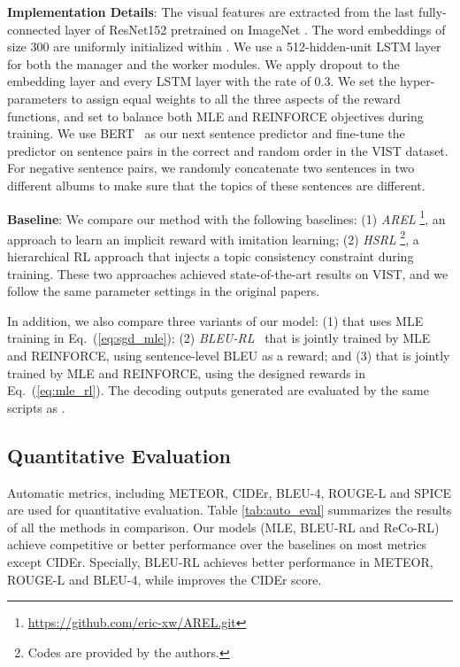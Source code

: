 \documentclass[letterpaper]{article} \usepackage{aaai20}  \usepackage{times}  \usepackage{helvet} \usepackage{courier}  \usepackage[hyphens]{url}  \usepackage{graphicx} \urlstyle{rm} \def\UrlFont{\rm}  \usepackage{graphicx}  \frenchspacing  \setlength{\pdfpagewidth}{8.5in}  \setlength{\pdfpageheight}{11in}  \usepackage{times}
\newcommand{\bleu}{BLEU-RL }
\newcommand{\citet}[1]{\citeauthor{#1} \shortcite{#1}}
\begin{document}
\noindent \textbf{Implementation Details}: The visual features are extracted from the last fully-connected layer of ResNet152 pretrained on ImageNet \cite{he2016deep}. The word embeddings of size 300 are uniformly initialized within . We use a 512-hidden-unit LSTM layer for both the manager and the worker modules. We apply dropout to the embedding layer and every LSTM layer with the rate of 0.3.  We set the hyper-parameters  to assign equal weights to all the three aspects of the reward functions, and set  to balance both MLE and REINFORCE objectives during training. We use BERT~\cite{devlin2018bert} as our next sentence predictor and fine-tune the predictor on sentence pairs in the correct and random order in the VIST dataset. For negative sentence pairs, we randomly concatenate two sentences in two different albums to make sure that the topics of these sentences are different. 

\noindent \textbf{Baseline}: We compare our method with the following baselines:
(1) \textit{AREL} \cite{xinwang-wenhuchen-ACL-2018}\footnote{\url{https://github.com/eric-xw/AREL.git}}, an approach to learn an implicit reward with imitation learning;
(2) \textit{HSRL} \cite{huang2018hierarchically}\footnote{Codes are provided by the authors.}, a hierarchical RL approach that injects a topic consistency constraint during training. 
These two approaches achieved state-of-the-art results on VIST, and we follow the same parameter settings in the original papers. 

In addition, we also compare three variants of our model: (1) \textit{\mle} that uses MLE training in Eq.~(\ref{eq:sgd_mle}); (2) \textit{\bleu}~that is jointly trained by MLE and REINFORCE, using sentence-level BLEU as a reward; and (3) \textit{\model} that is jointly trained by MLE and REINFORCE, using the designed rewards in Eq.~(\ref{eq:mle_rl}). The decoding outputs generated are evaluated by the same scripts as \citet{xinwang-wenhuchen-ACL-2018}. 

\subsection{Quantitative Evaluation} 
Automatic metrics, including METEOR, CIDEr, BLEU-4, ROUGE-L and SPICE are used for quantitative evaluation. Table \ref{tab:auto_eval} summarizes the results of all the methods in comparison. Our models (MLE, \bleu and ReCo-RL) achieve competitive or better performance over the baselines on most metrics except CIDEr. Specially, \bleu achieves better performance in METEOR, ROUGE-L and BLEU-4, while \model improves the CIDEr score.
\end{document}
